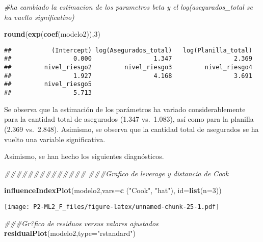 \documentclass[]{article}
\newenvironment{Shaded}{\begin{snugshade}}{\end{snugshade}}
\newcommand{\CommentTok}[1]{\textcolor[rgb]{0.56,0.35,0.01}{\textit{#1}}}
\newcommand{\DataTypeTok}[1]{\textcolor[rgb]{0.13,0.29,0.53}{#1}}
\newcommand{\DecValTok}[1]{\textcolor[rgb]{0.00,0.00,0.81}{#1}}
\newcommand{\KeywordTok}[1]{\textcolor[rgb]{0.13,0.29,0.53}{\textbf{#1}}}
\newcommand{\NormalTok}[1]{#1}
\newcommand{\StringTok}[1]{\textcolor[rgb]{0.31,0.60,0.02}{#1}}
\begin{document}
\begin{Shaded}
\begin{Highlighting}[]
\CommentTok{\#ha cambiado la estimacion de los parametros beta y el log(asegurados\_total se ha vuelto significativo)}

\KeywordTok{round}\NormalTok{(}\KeywordTok{exp}\NormalTok{(}\KeywordTok{coef}\NormalTok{(modelo2)),}\DecValTok{3}\NormalTok{)}
\end{Highlighting}
\end{Shaded}

\begin{verbatim}
##           (Intercept) log(Asegurados_total)   log(Planilla_total) 
##                 0.000                 1.347                 2.369 
##         nivel_riesgo2         nivel_riesgo3         nivel_riesgo4 
##                 1.927                 4.168                 3.691 
##         nivel_riesgo5 
##                 5.713
\end{verbatim}

Se observa que la estimación de los parámetros ha variado
considerablemente para la cantidad total de asegurados (1.347
vs.~1.083), así como para la planilla (2.369 vs.~2.848). Asimismo, se
observa que la cantidad total de asegurados se ha vuelto una variable
significativa.

Asimismo, se han hecho los siguientes diagnósticos.

\begin{Shaded}
\begin{Highlighting}[]
\CommentTok{\#\#\#\#\#\#\#\#\#\#\#\#\#\#}
\CommentTok{\#\#\#Grafico de leverage y distancia de Cook}

\KeywordTok{influenceIndexPlot}\NormalTok{(modelo2,}\DataTypeTok{vars=}\KeywordTok{c}\NormalTok{ (}\StringTok{"Cook"}\NormalTok{, }\StringTok{"hat"}\NormalTok{), }\DataTypeTok{id=}\KeywordTok{list}\NormalTok{(}\DataTypeTok{n=}\DecValTok{3}\NormalTok{))}
\end{Highlighting}
\end{Shaded}

\texttt{[image: P2-ML2\_F\_files/figure-latex/unnamed-chunk-25-1.pdf]}

\begin{Shaded}
\begin{Highlighting}[]
\CommentTok{\#\#\#Gr?fico de residuos versus valores ajustados}
\KeywordTok{residualPlot}\NormalTok{(modelo2,}\DataTypeTok{type=}\StringTok{"rstandard"}\NormalTok{)}
\end{Highlighting}
\end{Shaded}
\end{document}
